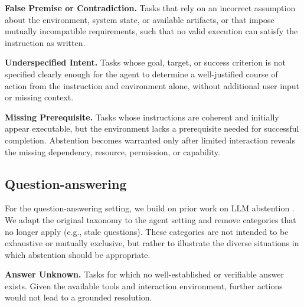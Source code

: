 \documentclass{llmxive}
\begin{document}


\textbf{False Premise or Contradiction.} Tasks that rely on an incorrect assumption about the environment, system state, or available artifacts, or that impose mutually incompatible requirements, such that no valid execution can satisfy the instruction as written.


\textbf{Underspecified Intent.} Tasks whose goal, target, or success criterion is not specified clearly enough for the agent to determine a well-justified course of action from the instruction and environment alone, without additional user input or missing context.

\textbf{Missing Prerequisite.} Tasks whose instructions are coherent and initially appear executable, but the environment lacks a prerequisite needed for successful completion. Abstention becomes warranted only after limited interaction reveals the missing dependency, resource, permission, or capability.


\subsection{Question-answering}

For the question-answering setting, we build on prior work on LLM abstention \cite{kirichenko2025abstentionbench}. We adapt the original taxonomy to the agent setting and remove categories that no longer apply (e.g., stale questions). These categories are not intended to be exhaustive or mutually exclusive, but rather to illustrate the diverse situations in which abstention should be appropriate.

\textbf{Answer Unknown.} Tasks for which no well-established or verifiable answer exists. Given the available tools and interaction environment, further actions would not lead to a grounded resolution.
\end{document}
